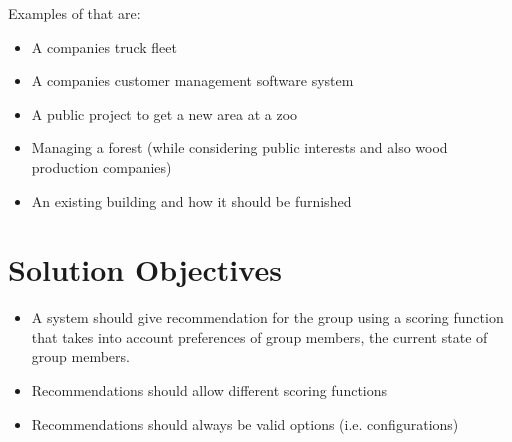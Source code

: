 Examples of that are:
\begin{itemize}
    \item A companies truck fleet
    \item A companies customer management software system
    \item A public project to get a new area at a zoo
    \item Managing a forest (while considering public interests and also wood production companies)
    \item An existing building and how it should be furnished
\end{itemize}

\section{Solution Objectives}
\label{sec:Introduction:Solution Objectives}

\begin{itemize}
    \item A system should give recommendation for the group using a scoring function that takes into account preferences of group members, the current state of group members.
    \item Recommendations should allow different scoring functions
    \item Recommendations should always be valid options (i.e. configurations)
\end{itemize}